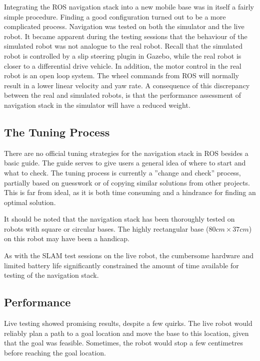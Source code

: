 Integrating the \ac{ROS} navigation stack into a new mobile base was in itself a fairly simple procedure. Finding a good configuration turned out to be a more complicated process. Navigation was tested on both the simulator and the live robot. It became apparent during the testing sessions that the behaviour of the simulated robot was not analogue to the real robot. Recall that the simulated robot is controlled by a slip steering plugin in Gazebo, while the real robot is closer to a differential drive vehicle. In addition, the motor control in the real robot is an open loop system. The wheel commands from \ac{ROS} will normally result in a lower linear velocity and yaw rate. A consequence of this discrepancy between the real and simulated robots, is that the performance assessment of navigation stack in the simulator will have a reduced weight.

\subsection{The Tuning Process}

There are no official tuning strategies for the navigation stack in \ac{ROS} besides a basic guide. The guide serves to give users a general idea of where to start and what to check\cite{ROS_navigation_tuning}. The tuning process is currently a ''change and check'' process, partially based on guesswork or of copying similar solutions from other projects. This is far from ideal, as it is both time consuming and a hindrance for finding an optimal solution. 

It should be noted that the navigation stack has been thoroughly tested on robots with square or circular bases. The highly rectangular base ($80cm \times 37cm$) on this robot may have been a handicap. 



As with the \ac{SLAM} test sessions on the live robot, the cumbersome hardware and limited battery life significantly constrained the amount of time available for testing of the navigation stack. 



\subsection{Performance}

Live testing showed promising results, despite a few quirks. The live robot would reliably plan a path to a goal location and move the base to this location, given that the goal was feasible. Sometimes, the robot would stop a few centimetres before reaching the goal location.

